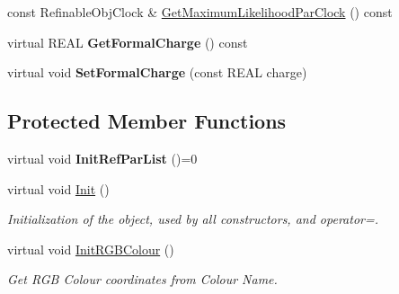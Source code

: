 \begin{DoxyCompactItemize}
const Refinable\+Obj\+Clock \& \mbox{\hyperlink{class_obj_cryst_1_1_scattering_power_a831505bd54282ec723e694f38e934ada}{Get\+Maximum\+Likelihood\+Par\+Clock}} () const
\item 
\mbox{\label{class_obj_cryst_1_1_scattering_power_a9638cbe4b7fcf11c80629553ffd36e51}} 
virtual R\+E\+AL {\bfseries Get\+Formal\+Charge} () const
\item 
\mbox{\label{class_obj_cryst_1_1_scattering_power_a9033543d24a34b0a2dbb77fab74f96dd}} 
virtual void {\bfseries Set\+Formal\+Charge} (const R\+E\+AL charge)
\end{DoxyCompactItemize}
\subsection*{Protected Member Functions}
\begin{DoxyCompactItemize}
\item 
\mbox{\label{class_obj_cryst_1_1_scattering_power_a963cfe56b67286007bb93c7962e72b5c}} 
virtual void {\bfseries Init\+Ref\+Par\+List} ()=0
\item 
\mbox{\label{class_obj_cryst_1_1_scattering_power_a3122dbedd94e3eb524da80999994ec14}} 
virtual void \mbox{\hyperlink{class_obj_cryst_1_1_scattering_power_a3122dbedd94e3eb524da80999994ec14}{Init}} ()
\begin{DoxyCompactList}\small\item\em Initialization of the object, used by all constructors, and operator=. \end{DoxyCompactList}\item 
\mbox{\label{class_obj_cryst_1_1_scattering_power_acc4a65b084b5fdd15e5063fea62f5cf0}} 
virtual void \mbox{\hyperlink{class_obj_cryst_1_1_scattering_power_acc4a65b084b5fdd15e5063fea62f5cf0}{Init\+R\+G\+B\+Colour}} ()
\begin{DoxyCompactList}\small\item\em Get R\+GB Colour coordinates from Colour Name. \end{DoxyCompactList}\end{DoxyCompactItemize}
